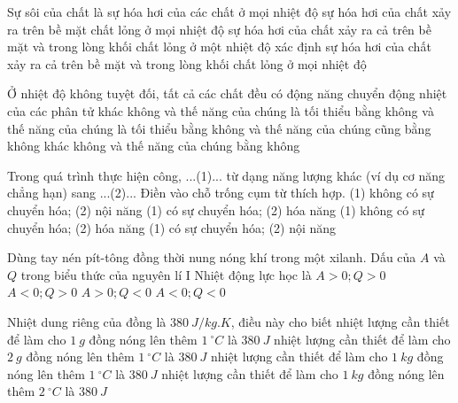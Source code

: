\begin{ex}%
	Sự sôi của chất là
	\choice
	{sự hóa hơi của các chất ở mọi nhiệt độ}
	{sự hóa hơi của chất xảy ra trên bề mặt chất lỏng ở mọi nhiệt độ}
	{\True sự hóa hơi của chất xảy ra cả trên bề mặt và trong lòng khối chất lỏng ở một nhiệt độ xác định}
	{sự hóa hơi của chất xảy ra cả trên bề mặt và trong lòng khối chất lỏng ở mọi nhiệt độ}
	\loigiai{
	}
\end{ex}

\begin{ex}%
	Ở nhiệt độ không tuyệt đối, tất cả các chất đều có động năng chuyển động nhiệt của các phân tử
	\choice
	{khác không và thế năng của chúng là tối thiểu}
	{bằng không và thế năng của chúng là tối thiểu}
	{bằng không và thế năng của chúng cũng bằng không}
	{\True khác không và thế năng của chúng bằng không}
	\loigiai{
		
	}
\end{ex}

\begin{ex}%
	Trong quá trình thực hiện công, ...(1)... từ dạng năng lượng khác (ví dụ cơ năng chẳng hạn) sang ...(2)... Điền vào chỗ trống cụm từ thích hợp.
	\choice
	{ (1) không có sự chuyển hóa; (2) nội năng}
	{ (1) có sự chuyển hóa; (2) hóa năng}
	{ (1) không có sự chuyển hóa; (2) hóa năng}
	{\True (1) có sự chuyển hóa; (2) nội năng}
	\loigiai{
		
	}
\end{ex}

\begin{ex}%
	Dùng tay nén pít-tông đồng thời nung nóng khí trong một xilanh. Dấu của $A$ và $Q$ trong biểu thức của nguyên lí I Nhiệt động lực học là
	\choice
	{\True $A > 0; Q > 0$}
	{$A < 0; Q > 0$}
	{$A > 0; Q < 0$}
	{$A < 0; Q < 0$}
	\loigiai{
		
	}
\end{ex}

\begin{ex}%
	Nhiệt dung riêng của đồng là $380\ J/kg.K$, điều này cho biết
	\choice
	{nhiệt lượng cần thiết để làm cho $1\ g$ đồng nóng lên thêm $1\ ^\circ C$ là $380\ J$}
	{nhiệt lượng cần thiết để làm cho $2\ g$ đồng nóng lên thêm $1\ ^\circ C$ là $380\ J$}
	{\True nhiệt lượng cần thiết để làm cho $1\ kg$ đồng nóng lên thêm $1\ ^\circ C$ là $380\ J$}
	{nhiệt lượng cần thiết để làm cho $1\ kg$ đồng nóng lên thêm $2\ ^\circ C$ là $380\ J$}
	\loigiai{
		
	}
\end{ex}

